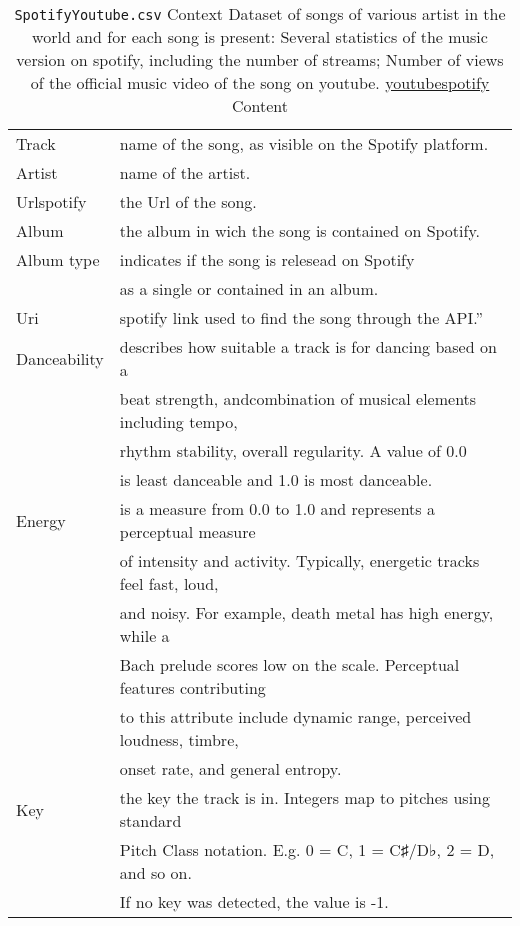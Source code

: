 \documentclass[12pt]{article}
\theoremstyle{remark}
\begin{document}


\begin{table}
	\caption{ \texttt{SpotifyYoutube.csv}
Context
Dataset of songs of various artist in the world and for each song is present:
Several statistics of the music version on spotify, including the number of streams;
Number of views of the official music video of the song on youtube.
\href{ https://www.kaggle.com/datasets/salvatorerastelli/spotify-and-youtube}{youtubespotify} Content
}
	\begin{tabular}{l|l}\hline
Track & name of the song, as visible on the Spotify platform.\\
Artist & name of the artist.\\
Urlspotify & the Url of the song.\\
Album & the album in wich the song is contained on Spotify.\\
Album type & indicates if the song is relesead on Spotify\\
& as a single or contained in an album.\\
Uri & spotify link used to find the song through the API.''\\
Danceability & describes how suitable a track is for dancing based on a \\
&  beat strength, andcombination of musical elements including tempo,  \\
& rhythm stability, overall regularity. A value of 0.0 \\
& is least danceable and 1.0 is most danceable. \\
Energy & is a measure from 0.0 to 1.0 and represents a perceptual measure \\
& of intensity and activity. Typically, energetic tracks feel fast, loud,\\
& and noisy. For example, death metal has high energy, while a \\
& Bach prelude scores low on the scale. Perceptual features contributing\\
& to this attribute include dynamic range, perceived loudness, timbre, \\
& onset rate, and general entropy.\\
Key & the key the track is in. Integers map to pitches using standard \\
& Pitch Class notation. E.g. 0 = C, 1 = C♯/D♭, 2 = D, and so on. \\
& If no key was detected, the value is -1.\\

\end{tabular}
\end{table}
\end{document}
